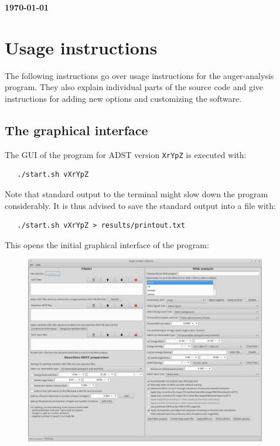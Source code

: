 \documentclass[12pt,a4paper]{report}
\begin{document}

\begin{flushright}
{\large\textbf{\today}}
\end{flushright}

\begingroup
\let\clearpage\relax
\chapter{Usage instructions}
\endgroup
{\noindent}The following instructions go over usage instructions for the auger-analysis program. They also explain individual parts of the source code and give instructions for adding new options and customizing the software.

\section{The graphical interface}
The GUI of the program for ADST version \texttt{XrYpZ} is executed with:
\begin{verbatim}
   ./start.sh vXrYpZ
\end{verbatim}
Note that standard output to the terminal might slow down the program considerably. It is thus advised to save the standard output into a file with:
\begin{verbatim}
   ./start.sh vXrYpZ > results/printout.txt
\end{verbatim}
This opens the initial graphical interface of the program:
\begin{figure}[H]
\centerline{\includegraphics[width=0.94\textwidth]{figures/software_screenshot_1.png}}
\end{figure}
\end{document}
